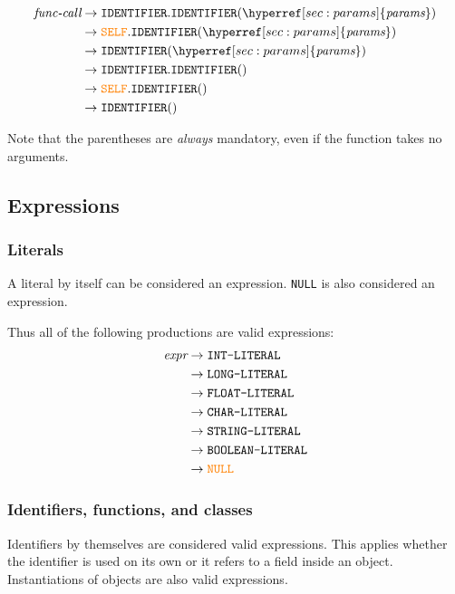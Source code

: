 \documentclass{article}
\begin{document}
\label{sec:func-call}
\begin{align*}
    \textit{func-call} &\to \texttt{IDENTIFIER}. \texttt{IDENTIFIER}(\hyperref[sec:params]{\textit{params}}) \\
    &\to \textcolor{orange}{\texttt{SELF}}.\texttt{IDENTIFIER}(\hyperref[sec:params]{\textit{params}}) \\
    &\to \texttt{IDENTIFIER}(\hyperref[sec:params]{\textit{params}}) \\
    &\to \texttt{IDENTIFIER}.\texttt{IDENTIFIER}() \\
    &\to \textcolor{orange}{\texttt{SELF}}.\texttt{IDENTIFIER}() \\
    &\to \texttt{IDENTIFIER}() \\
\end{align*}

Note that the parentheses are \textit{always} mandatory, even if the function takes no arguments.

\subsection{Expressions}
\label{sec:expr}
\subsubsection{Literals}
A literal by itself can be considered an expression. \texttt{NULL} is also considered an expression.

Thus all of the following productions are valid expressions:
\begin{align*}
    \textit{expr} &\to \texttt{INT-LITERAL} \\
    &\to \texttt{LONG-LITERAL} \\
    &\to \texttt{FLOAT-LITERAL} \\
    &\to \texttt{CHAR-LITERAL} \\
    &\to \texttt{STRING-LITERAL} \\
    &\to \texttt{BOOLEAN-LITERAL} \\
    &\to \textcolor{orange}{\texttt{NULL}} \\
\end{align*}

\subsubsection{Identifiers, functions, and classes}
Identifiers by themselves are considered valid expressions. This applies whether the identifier is used on its own or it refers to a field inside an object. Instantiations of objects are also valid expressions.
\end{document}

